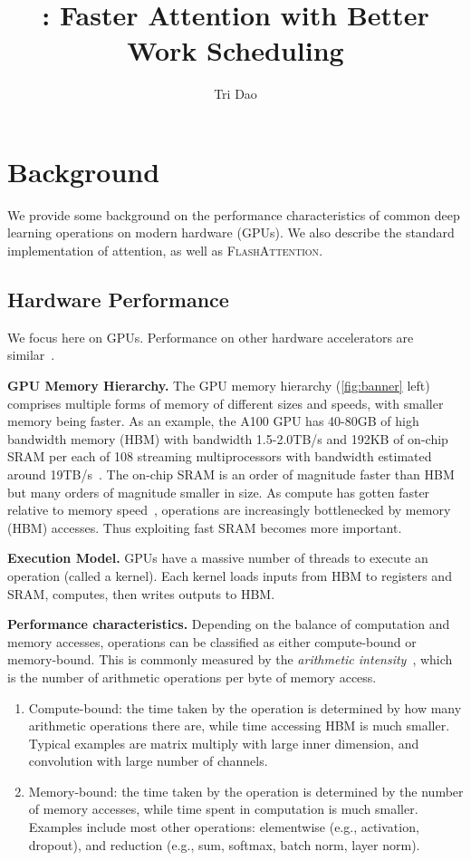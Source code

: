 \message{ !name(../flash2.tex)}\documentclass{article}
\title{\sysname: Faster Attention with Better Work Scheduling}
\author[$\dagger$]{Tri Dao}
\affil[$\dagger$]{Department of Computer Science, Princeton University}
\newcommand{\sysnameone}{\textsc{FlashAttention}\xspace}
\begin{document}
\section{Background}
\label{sec:background}

We provide some background on the performance characteristics of common deep
learning operations on modern hardware (GPUs).
We also describe the standard implementation of attention, as well as \sysnameone.

\subsection{Hardware Performance}
\label{subsec:hardware}

We focus here on GPUs.
Performance on other hardware accelerators are similar~\citep{jouppi2017datacenter, jia2019dissecting}.

\textbf{GPU Memory Hierarchy.}
The GPU memory hierarchy (\cref{fig:banner} left) comprises multiple forms of memory of different
sizes and speeds, with smaller memory being faster.
As an example, the A100 GPU has 40-80GB of high bandwidth memory (HBM) with
bandwidth 1.5-2.0TB/s and 192KB of on-chip SRAM per each of 108 streaming
multiprocessors with
bandwidth estimated around 19TB/s~\citep{jia2018dissecting, jia2021dissecting}.
The on-chip SRAM is an order of magnitude faster than HBM but many orders of
magnitude smaller in size.
As compute has gotten faster relative to memory speed~\citep{nvidia2017nvidia,nvidia2020nvidia,nvidia2022nvidia}, operations
are increasingly bottlenecked by memory (HBM) accesses.
Thus exploiting fast SRAM becomes more important.

\textbf{Execution Model.}
GPUs have a massive number of threads to execute an operation
(called a kernel).
Each kernel loads inputs from HBM to registers and SRAM, computes, then writes outputs to HBM.

\textbf{Performance characteristics.} Depending on the balance of computation and memory accesses, operations can be
classified as either compute-bound or memory-bound.
This is commonly measured by the \emph{arithmetic intensity}~\citep{williams2009roofline},
which is the number of arithmetic operations per byte of memory access.
\begin{enumerate}[itemsep=0.1pt,topsep=0pt,leftmargin=*]
  \item Compute-bound: the time taken by the operation is determined by how many
  arithmetic operations there are, while time accessing HBM
  is much smaller. Typical examples are matrix multiply with large inner
  dimension, and convolution with large number of channels.
  \item Memory-bound: the time taken by the operation is determined by the
  number of memory accesses, while time spent in computation is much smaller.
  Examples include most other operations:
  elementwise (e.g., activation, dropout), and reduction (e.g., sum,
  softmax, batch norm, layer norm).
\end{enumerate}
\end{document}
